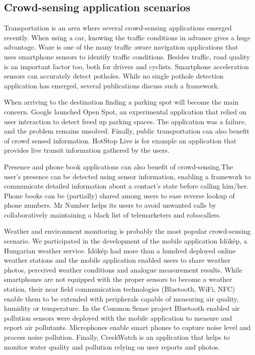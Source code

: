 \documentclass[conference,letterpaper]{IEEEtran}
\begin{document}
\subsection{Crowd-sensing application scenarios}
Transportation is an area where several crowd-sensing applications emerged recently. When using a car, knowing the traffic conditions in advance gives a huge advantage. Waze is one of the many traffic aware navigation applications that uses smartphone sensors to identify traffic conditions. Besides traffic, road quality is an important factor too, both for drivers and cyclists. Smartphone acceleration sensors can accurately detect potholes. While no single pothole detection application has emerged, several publications discuss such a framework.

When arriving to the destination finding a parking spot will become the main concern. Google launched Open Spot, an experimental application that relied on user interaction to detect freed up parking spaces. The application was a failure, and the problem remains unsolved. Finally, public transportation can also benefit of crowd sensed information. HotStop Live is for example an application that provides live transit information gathered by the users.

Presence and phone book applications can also benefit of crowd-sensing.The user's presence can be detected using sensor information, enabling a framework to communicate detailed information about a contact's state before calling him/her. Phone books can be (partially) shared among users to ease reverse lookup of phone numbers. Mr Number helps its users to avoid unwanted calls by collaboratively maintaining a black list of telemarketers and robocallers.

Weather and environment monitoring is probably the most popular crowd-sensing scenario. We participated in the development of the mobile application  Id\"ok\'ep, a Hungarian weather service. Id\"ok\'ep had more than a hundred deployed online weather stations and the mobile application enabled users to share weather photos, perceived weather conditions and analogue measurement results.
While smartphones are not equipped with the proper sensors to become a weather station, their near field communication technologies (Bluetooth, WiFi, NFC) enable them to be extended with peripherals capable of measuring air quality, humidity or temperature. In the Common Sense project Bluetooth enabled air pollution sensors were deployed with the mobile application to measure and report air pollutants. Microphones enable smart phones to capture noise level and process noise pollution.
Finally, CreekWatch is an application that helps to monitor water quality and pollution relying on user reports and photos.
\end{document}
